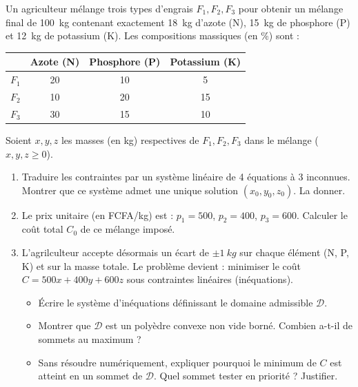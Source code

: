 \documentclass[11pt]{article}
\begin{document}
\begin{exercice}
Un agriculteur mélange trois types d'engrais $F_1, F_2, F_3$ pour obtenir un mélange final de \SI{100}{kg} contenant exactement \SI{18}{kg} d'azote (N), \SI{15}{kg} de phosphore (P) et \SI{12}{kg} de potassium (K).
Les compositions massiques (en \%) sont :
\begin{center}
\begin{tabular}{|c|c|c|c|}
\hline
 & Azote (N) & Phosphore (P) & Potassium (K) \\ \hline
$F_1$ & 20 & 10 & 5 \\ \hline
$F_2$ & 10 & 20 & 15 \\ \hline
$F_3$ & 30 & 15 & 10 \\ \hline
\end{tabular}
\end{center}
Soient $x, y, z$ les masses (en kg) respectives de $F_1, F_2, F_3$ dans le mélange ($x,y,z \geq 0$).
\begin{enumerate}
    \item Traduire les contraintes par un système linéaire de 4 équations à 3 inconnues. Montrer que ce système admet une unique solution $(x_0, y_0, z_0)$. La donner.
    \item Le prix unitaire (en FCFA/kg) est : $p_1 = 500$, $p_2 = 400$, $p_3 = 600$. Calculer le coût total $C_0$ de ce mélange imposé.
    \item L'agrilculteur accepte désormais un écart de $\pm \SI{1}{kg}$ sur chaque élément (N, P, K) et sur la masse totale. Le problème devient : minimiser le coût $C = 500x + 400y + 600z$ sous contraintes linéaires (inéquations).
    \begin{itemize}
        \item Écrire le système d'inéquations définissant le domaine admissible $\mathcal{D}$.
        \item Montrer que $\mathcal{D}$ est un polyèdre convexe non vide borné. Combien a-t-il de sommets au maximum ?
        \item Sans résoudre numériquement, expliquer pourquoi le minimum de $C$ est atteint en un sommet de $\mathcal{D}$. Quel sommet tester en priorité ? Justifier.
    \end{itemize}
\end{enumerate}
\end{exercice}
\end{document}

